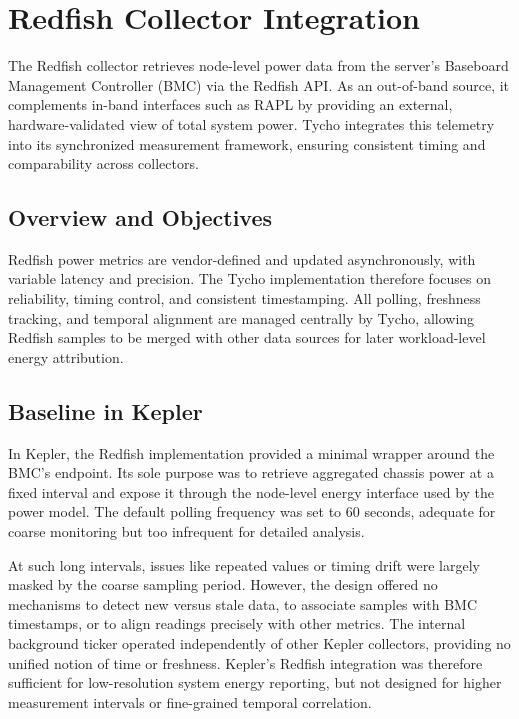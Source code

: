 \section{Redfish Collector Integration}
\label{sec:redfish_collector}

The Redfish collector retrieves node-level power data from the server’s Baseboard Management Controller (BMC) via the Redfish API.  
As an out-of-band source, it complements in-band interfaces such as RAPL by providing an external, hardware-validated view of total system power.  
Tycho integrates this telemetry into its synchronized measurement framework, ensuring consistent timing and comparability across collectors.

\subsection{Overview and Objectives}
\label{subsec:redfish_overview}

Redfish power metrics are vendor-defined and updated asynchronously, with variable latency and precision.  
The Tycho implementation therefore focuses on reliability, timing control, and consistent timestamping.  
All polling, freshness tracking, and temporal alignment are managed centrally by Tycho, allowing Redfish samples to be merged with other data sources for later workload-level energy attribution.

\subsection{Baseline in Kepler}
\label{subsec:redfish_baseline}

In Kepler, the Redfish implementation provided a minimal wrapper around the BMC’s  endpoint.  
Its sole purpose was to retrieve aggregated chassis power at a fixed interval and expose it through the node-level energy interface used by the power model.  
The default polling frequency was set to 60 seconds, adequate for coarse monitoring but too infrequent for detailed analysis.

At such long intervals, issues like repeated values or timing drift were largely masked by the coarse sampling period.  
However, the design offered no mechanisms to detect new versus stale data, to associate samples with BMC timestamps, or to align readings precisely with other metrics.  
The internal background ticker operated independently of other Kepler collectors, providing no unified notion of time or freshness.  
Kepler’s Redfish integration was therefore sufficient for low-resolution system energy reporting, but not designed for higher measurement intervals or fine-grained temporal correlation.

